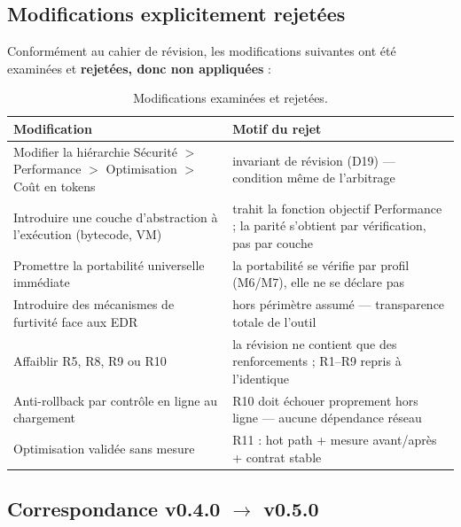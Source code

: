 \subsection{Modifications explicitement rejetées}\label{sec:rejets}

Conformément au cahier de révision, les modifications suivantes ont été examinées et
\textbf{rejetées, donc non appliquées} :

\begin{table}[htbp]
\centering\small
\caption{Modifications examinées et rejetées.}
\label{tab:rejets}
\begin{tabularx}{\textwidth}{@{}Y Y@{}}
\toprule
\textbf{Modification} & \textbf{Motif du rejet} \\
\midrule
Modifier la hiérarchie Sécurité $>$ Performance $>$ Optimisation $>$ Coût en tokens &
invariant de révision (D19) — condition même de l'arbitrage \\
Introduire une couche d'abstraction à l'exécution (bytecode, VM) & trahit la fonction
objectif Performance ; la parité s'obtient par vérification, pas par couche \\
Promettre la portabilité universelle immédiate & la portabilité se vérifie par profil
(M6/M7), elle ne se déclare pas \\
Introduire des mécanismes de furtivité face aux EDR & hors périmètre assumé —
transparence totale de l'outil \\
Affaiblir R5, R8, R9 ou R10 & la révision ne contient que des renforcements ; R1–R9
repris à l'identique \\
Anti-rollback par contrôle en ligne au chargement & R10 doit échouer proprement hors
ligne — aucune dépendance réseau \\
Optimisation validée sans mesure & R11 : hot path + mesure avant/après + contrat stable \\
\bottomrule
\end{tabularx}
\end{table}


\subsection{Correspondance v0.4.0 $\to$ v0.5.0}\label{sec:evolutions050}

